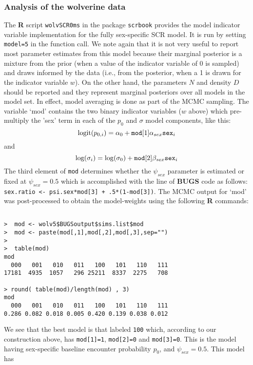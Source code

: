 \subsubsection{Analysis of the wolverine data}

The {\bf R} script \mbox{\tt wolvSCR0ms} in the package \mbox{\tt scrbook}
provides the model indicator variable implementation for the fully
sex-specific SCR model.  It is run by setting \mbox{\tt model=5} in
the function call. We note again that it is not very useful to report most
parameter estimates from this model because their marginal posterior
is a mixture from the prior (when a value of the indicator variable of
0 is sampled) and draws informed by the data (i.e., from the
posterior, when a 1 is drawn for the indicator variable $w$).
 On the other hand, the parameters
$N$ and density $D$ should be reported and they represent marginal
posteriors over all models in the model set. In effect, model
averaging is done as part of the MCMC sampling.  The variable `mod'
contains the two binary indicator variables ($w$ above) which
pre-multiply the 'sex' term in each of the $p_{0}$ and $\sigma$ model
components, like this:
\[
 \mbox{logit}(p_{0,i}) = \alpha_{0} + \mbox{\tt mod}[1] \alpha_{sex} \mbox{\tt sex}_{i}
\]
and
\[
 \mbox{log}(\sigma_{i}) = \log(\sigma_{0}) + \mbox{\tt mod}[2] \beta_{sex} \mbox{\tt sex}_{i}
\]
The third element of \mbox{\tt mod} determines whether the
$\psi_{sex}$ parameter is estimated or fixed at $\psi_{sex} =
0.5$ which is accomplished with the line of {\bf BUGS} code as
follows:
\newline 
\mbox{\tt sex.ratio <- psi.sex*mod[3] + .5*(1-mod[3])}.
The MCMC output for `mod' was post-processed to obtain the
model-weights using the following  {\bf R} commands:
\begin{verbatim}

>  mod <- wolv5$BUGSoutput$sims.list$mod
>  mod <- paste(mod[,1],mod[,2],mod[,3],sep="")
>
>  table(mod)
mod
  000   001   010   011   100   101   110   111
17181  4935  1057   296 25211  8337  2275   708

> round( table(mod)/length(mod) , 3)
mod
  000   001   010   011   100   101   110   111
0.286 0.082 0.018 0.005 0.420 0.139 0.038 0.012

\end{verbatim}
We see that the best model is that labeled \mbox{\tt 100} which,
according to our construction above, has \mbox{\tt mod[1]=1},
\mbox{\tt mod[2]=0} and \mbox{\tt mod[3]=0}. This is the model 
having sex-specific baseline
encounter probability $p_{0}$, and $\psi_{sex} = 0.5$. This model has 
